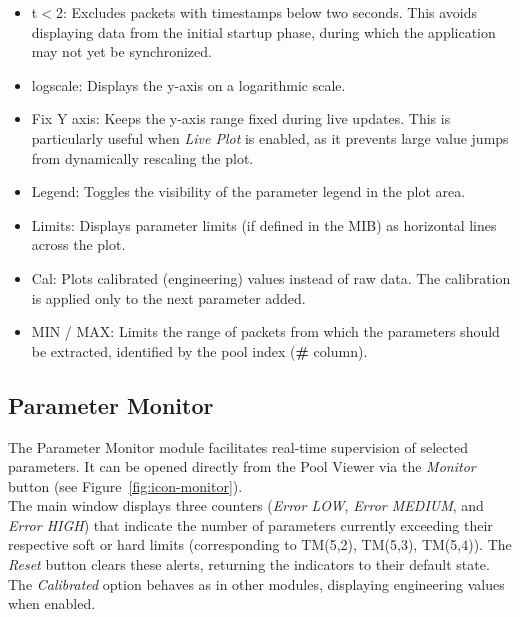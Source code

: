 \begin{itemize}

\item t$<$2: Excludes packets with timestamps below two seconds. This avoids displaying data from the initial startup phase, during which the application may not yet be synchronized.

\item logscale: Displays the y-axis on a logarithmic scale.

\item Fix Y axis: Keeps the y-axis range fixed during live updates. This is particularly useful when \emph{Live Plot} is enabled, as it prevents large value jumps from dynamically rescaling the plot.

\item Legend: Toggles the visibility of the parameter legend in the plot area.

\item Limits: Displays parameter limits (if defined in the MIB) as horizontal lines across the plot.

\item Cal: Plots calibrated (engineering) values instead of raw data. The calibration is applied only to the next parameter added.

\item MIN / MAX: Limits the range of packets from which the parameters should be extracted, identified by the pool index (\textbf{\#} column).

\end{itemize}


\subsection{Parameter Monitor} \label{monitor}




The Parameter Monitor module facilitates real-time supervision of selected parameters. 
It can be opened directly from the Pool Viewer via the \emph{Monitor} button (see Figure~\ref{fig:icon-monitor}). \\

The main window displays three counters (\emph{Error LOW}, \emph{Error MEDIUM}, and \emph{Error HIGH}) that indicate the number of parameters currently exceeding their respective soft or hard limits (corresponding to TM(5,2), TM(5,3), TM(5,4)). The \emph{Reset} button clears these alerts, returning the indicators to their default state. 
The \emph{Calibrated} option behaves as in other modules, displaying engineering values when enabled.\\

